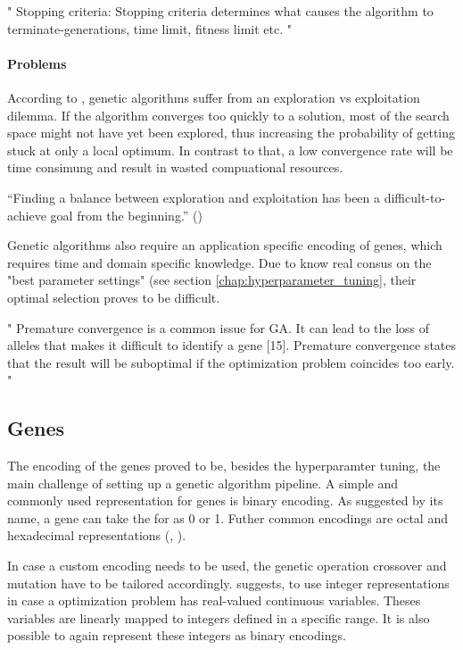 "
Stopping criteria: Stopping criteria determines what causes the algorithm to terminate-generations, time limit, fitness limit etc.
"\cite{majumdar_genetic_2015}


\paragraph{Problems}
According to \cite{hussain_trade-off_2020}, genetic algorithms suffer from an exploration vs exploitation dilemma. If the algorithm converges too quickly to a solution, most of the search space might not have yet been explored, thus increasing the probability of getting stuck at only a local optimum.
In contrast to that, a low convergence rate will be time consimung and result in wasted compuational resources.

\enquote{Finding a balance between exploration and exploitation has been a difficult-to-achieve goal from the beginning.} (\cite{kacprzyk_parameter_2007})

Genetic algorithms also require an application specific encoding of genes, which requires time and domain specific knowledge. Due to know real consus on the "best parameter settings" (see section \ref{chap:hyperparameter_tuning}, their optimal selection proves to be difficult.

"
Premature convergence is a common issue for GA. It can lead to the loss of alleles that makes it difficult to identify a gene [15]. Premature convergence states that the result will be suboptimal if the optimization problem coincides too early.
"\cite{katoch_review_2021}

\subsection{Genes}
\label{chap:foundation:ga:encoding}

The encoding of the genes proved to be, besides the hyperparamter tuning, the main challenge of setting up a genetic algorithm pipeline.
A simple and commonly used representation for genes is binary encoding. As suggested by its name, a gene can take the for as 0 or 1. Futher common encodings are octal and hexadecimal representations (\cite{srinivas_genetic_1994}, \cite{katoch_review_2021}).

In case a custom encoding needs to be used, the genetic operation crossover and mutation have to be tailored accordingly. \cite{srinivas_genetic_1994} suggests, to use integer representations in case a optimization problem has real-valued continuous variables. Theses variables are linearly mapped to integers defined in a specific range. It is also possible to again represent these integers as binary encodings.


